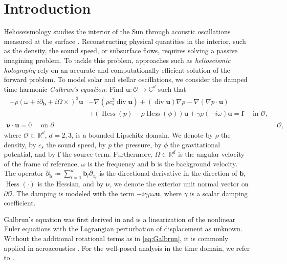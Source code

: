 \documentclass{m2an}
\newcommand{\dom}{\mathcal{O}} %
\newcommand{\nv}{\boldsymbol{\nu}}
\newcommand{\bflow}{\mathbf{b}}
\newcommand{\angvel}{\Omega}
\newcommand{\conv}{\partial_{\bflow}} %
\newcommand{\opd}{(\omega+i\conv+i\angvel\times)}
\renewcommand{\u}{\mathbf{u}}
\renewcommand{\div}{\operatorname{div}}
\DeclareMathOperator{\hess}{Hess}
\newcommand{\bff}{\mathbf{f}}
\newcommand{\diffb}{\partial_{\bflow}}
\theoremstyle{plain}
\theoremstyle{definition}
\begin{document}
\maketitle
\section{Introduction}
Helioseismology studies the interior of the Sun through acoustic oscillations measured at the surface \cite{GBS10}. Reconstructing physical quantities in the interior, such as the density, the sound speed, or subsurface flows, requires solving a passive imagining problem.  To tackle this problem, approaches such as \emph{helioseismic holography} \cite{LB97,BH24} rely on an accurate and computationally efficient solution of the forward problem. To model solar and stellar oscillations, we consider the damped time-harmonic \emph{Galbrun's equation}: Find $\u : \dom \to \mathbb{C}^d$ such that 
\begin{subequations}\label{eq:Galbrun}
\begin{align}
   \begin{aligned}
      -\rho\opd^2\u 
      &- \nabla\left(\rho c_s^2\div \u\right)
      + (\div \u) \nabla p -\nabla(\nabla p\cdot \u)\\
      & + (\hess(p)-\rho\hess(\phi))\u 
      + \gamma \rho (-i \omega) \u
      = \bff \quad \text{ in } \dom,
   \end{aligned}& \\
   \nv \cdot \u = 0 \quad \text{ on } \partial &\dom,
\end{align}
\end{subequations}
where $\dom \subset \mathbb{R}^d$, $d = 2,3$, is a bounded Lipschitz domain.
We denote by $\rho$ the density, by $c_s$ the sound speed, by $p$ the pressure, by $\phi$ the gravitational potential, and by $\bff$ the source term. Furthermore, $\angvel \in \mathbb{R}^d$ is the angular velocity of the frame of reference, $\omega$ is the frequency and $\bflow$ is the background velocity. The operator $\diffb \coloneqq \sum_{l = 1}^d \bflow_l \partial_{x_l}$ is the directional derivative in the direction of $\bflow$, $\hess(\cdot)$ is the Hessian, and by $\nv$, we denote the exterior unit normal vector on $\partial \dom$. The damping is modeled with the term $-i \gamma \rho \omega \u$, where $\gamma$ is a scalar damping coefficient. 

Galbrun's equation was first derived in \cite{Galbrun31} and is a linearization of the nonlinear Euler equations with the Lagrangian perturbation of displacement as unknown. Without the additional rotational terms as in \eqref{eq:Galbrun}, it is commonly applied in aeroacoustics \cite{90yrsGalbrun}. For the well-posed analysis in the time domain, we refer to \cite{HB21}. 
\end{document}
